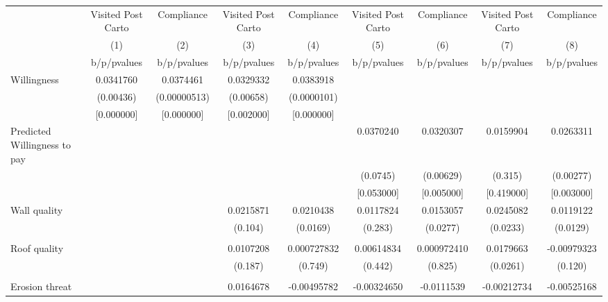 {
\def\sym#1{\ifmmode^{#1}\else\(^{#1}\)\fi}
\begin{tabular}{l*{8}{c}}
\toprule
                &\multicolumn{1}{c}{Visited Post Carto}&\multicolumn{1}{c}{Compliance}&\multicolumn{1}{c}{Visited Post Carto}&\multicolumn{1}{c}{Compliance}&\multicolumn{1}{c}{Visited Post Carto}&\multicolumn{1}{c}{Compliance}&\multicolumn{1}{c}{Visited Post Carto}&\multicolumn{1}{c}{Compliance}\\
                &\multicolumn{1}{c}{(1)}&\multicolumn{1}{c}{(2)}&\multicolumn{1}{c}{(3)}&\multicolumn{1}{c}{(4)}&\multicolumn{1}{c}{(5)}&\multicolumn{1}{c}{(6)}&\multicolumn{1}{c}{(7)}&\multicolumn{1}{c}{(8)}\\
                &b/p/pvalues&b/p/pvalues&b/p/pvalues&b/p/pvalues&b/p/pvalues&b/p/pvalues&b/p/pvalues&b/p/pvalues\\
\midrule
Willingness     &0.0341760&0.0374461&0.0329332&0.0383918&         &         &         &         \\
                &(0.00436)&(0.00000513)&(0.00658)&(0.0000101)&         &         &         &         \\
                &[0.000000]&[0.000000]&[0.002000]&[0.000000]&         &         &         &         \\
Predicted Willingness to pay&         &         &         &         &0.0370240&0.0320307&0.0159904&0.0263311\\
                &         &         &         &         & (0.0745)&(0.00629)&  (0.315)&(0.00277)\\
                &         &         &         &         &[0.053000]&[0.005000]&[0.419000]&[0.003000]\\
Wall quality    &         &         &0.0215871&0.0210438&0.0117824&0.0153057&0.0245082&0.0119122\\
                &         &         &  (0.104)& (0.0169)&  (0.283)& (0.0277)& (0.0233)& (0.0129)\\
                &         &         &         &         &         &         &         &         \\
Roof quality    &         &         &0.0107208&0.000727832&0.00614834&0.000972410&0.0179663&-0.00979323\\
                &         &         &  (0.187)&  (0.749)&  (0.442)&  (0.825)& (0.0261)&  (0.120)\\
                &         &         &         &         &         &         &         &         \\
Erosion threat  &         &         &0.0164678&-0.00495782&-0.00324650&-0.0111539&-0.00212734&-0.00525168\\

\end{tabular}}
